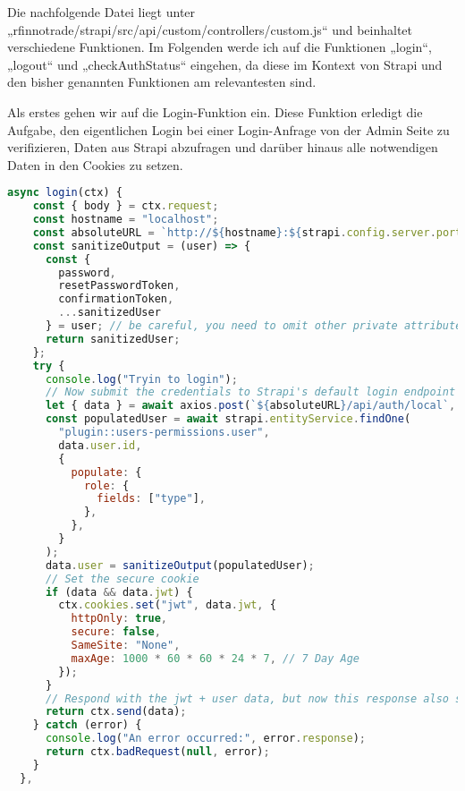 Die nachfolgende Datei liegt unter „rfinnotrade/strapi/src/api/custom/controllers/custom.js“ und beinhaltet verschiedene Funktionen. Im Folgenden werde ich auf die Funktionen „login“, „logout“ und „checkAuthStatus“ eingehen, da diese im Kontext von Strapi und den bisher genannten Funktionen am relevantesten sind.

Als erstes gehen wir auf die Login-Funktion ein. Diese Funktion erledigt die Aufgabe, den eigentlichen Login bei einer Login-Anfrage von der Admin Seite zu verifizieren, Daten aus Strapi abzufragen und darüber hinaus alle notwendigen Daten in den Cookies zu setzen.

\begin{lstlisting}[language=JavaScript, caption={Login-Funktion}, label={lst:customjsLogin}]
async login(ctx) {
    const { body } = ctx.request;
    const hostname = "localhost";
    const absoluteURL = `http://${hostname}:${strapi.config.server.port}`;
    const sanitizeOutput = (user) => {
      const {
        password,
        resetPasswordToken,
        confirmationToken,
        ...sanitizedUser
      } = user; // be careful, you need to omit other private attributes yourself
      return sanitizedUser;
    };
    try {
      console.log("Tryin to login");
      // Now submit the credentials to Strapi's default login endpoint
      let { data } = await axios.post(`${absoluteURL}/api/auth/local`, body);
      const populatedUser = await strapi.entityService.findOne(
        "plugin::users-permissions.user",
        data.user.id,
        {
          populate: {
            role: {
              fields: ["type"],
            },
          },
        }
      );
      data.user = sanitizeOutput(populatedUser);
      // Set the secure cookie
      if (data && data.jwt) {
        ctx.cookies.set("jwt", data.jwt, {
          httpOnly: true,
          secure: false,
          SameSite: "None",
          maxAge: 1000 * 60 * 60 * 24 * 7, // 7 Day Age
        });
      }
      // Respond with the jwt + user data, but now this response also sets the JWT as a secure cookie
      return ctx.send(data);
    } catch (error) {
      console.log("An error occurred:", error.response);
      return ctx.badRequest(null, error);
    }
  },
\end{lstlisting}

